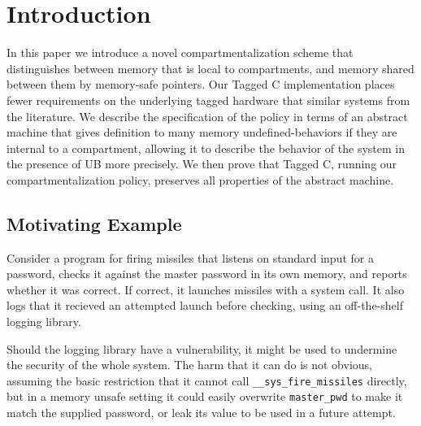 \documentclass{article}
\begin{document}



\section{Introduction}

In this paper we introduce a novel compartmentalization scheme that distinguishes between memory
that is local to compartments, and memory shared between them by memory-safe pointers. Our Tagged
C implementation places fewer requirements on the underlying tagged hardware that similar systems
from the literature. We describe the specification of the policy in terms of an abstract machine
that gives definition to many memory undefined-behaviors if they are internal to a compartment,
allowing it to describe the behavior of the system in the presence of UB more precisely. We then prove
that Tagged C, running our compartmentalization policy, preserves all properties of the abstract
machine.

\subsection{Motivating Example}

Consider a program for firing missiles that listens on standard input for a password,
checks it against the master password in its own memory, and reports whether it was correct.
If correct, it launches missiles with a system call. It also logs that it recieved an attempted
launch before checking, using an off-the-shelf logging library.

Should the logging library have a vulnerability, it might be used to undermine the security
of the whole system. The harm that it can do is not obvious, assuming the basic restriction that
it cannot call {\tt \_\_sys\_fire\_missiles} directly, but in a memory unsafe setting it could
easily overwrite {\tt master\_pwd} to make it match the supplied password, or leak its value to
be used in a future attempt.
\end{document}
